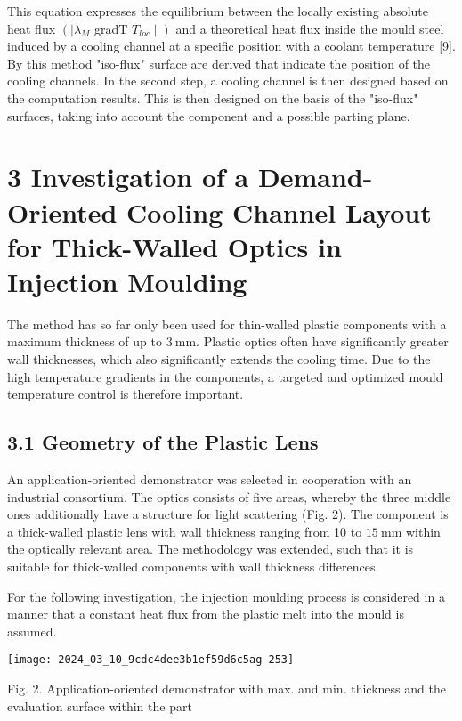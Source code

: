 \documentclass[10pt]{article}
\begin{document}
This equation expresses the equilibrium between the locally existing absolute heat flux $\left(\mid \lambda_{M}\right.$ gradT $\left.T_{l o c} \mid\right)$ and a theoretical heat flux inside the mould steel induced by a cooling channel at a specific position with a coolant temperature [9]. By this method "iso-flux" surface are derived that indicate the position of the cooling channels. In the second step, a cooling channel is then designed based on the computation results. This is then designed on the basis of the "iso-flux" surfaces, taking into account the component and a possible parting plane.

\section*{3 Investigation of a Demand-Oriented Cooling Channel Layout for Thick-Walled Optics in Injection Moulding}
The method has so far only been used for thin-walled plastic components with a maximum thickness of up to $3 \mathrm{~mm}$. Plastic optics often have significantly greater wall thicknesses, which also significantly extends the cooling time. Due to the high temperature gradients in the components, a targeted and optimized mould temperature control is therefore important.

\subsection*{3.1 Geometry of the Plastic Lens}
An application-oriented demonstrator was selected in cooperation with an industrial consortium. The optics consists of five areas, whereby the three middle ones additionally have a structure for light scattering (Fig. 2). The component is a thick-walled plastic lens with wall thickness ranging from 10 to $15 \mathrm{~mm}$ within the optically relevant area. The methodology was extended, such that it is suitable for thick-walled components with wall thickness differences.

For the following investigation, the injection moulding process is considered in a manner that a constant heat flux from the plastic melt into the mould is assumed.

\begin{center}
\texttt{[image: 2024\_03\_10\_9cdc4dee3b1ef59d6c5ag-253]}
\end{center}

Fig. 2. Application-oriented demonstrator with max. and min. thickness and the evaluation surface within the part
\end{document}
